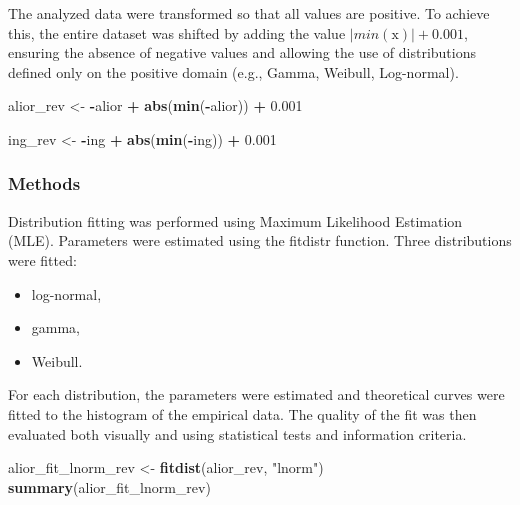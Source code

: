 \documentclass[
]{article}
\newenvironment{Shaded}{\begin{snugshade}}{\end{snugshade}}
\newcommand{\FloatTok}[1]{\textcolor[rgb]{0.00,0.00,0.81}{#1}}
\newcommand{\FunctionTok}[1]{\textcolor[rgb]{0.13,0.29,0.53}{\textbf{#1}}}
\newcommand{\NormalTok}[1]{#1}
\newcommand{\OtherTok}[1]{\textcolor[rgb]{0.56,0.35,0.01}{#1}}
\newcommand{\SpecialCharTok}[1]{\textcolor[rgb]{0.81,0.36,0.00}{\textbf{#1}}}
\newcommand{\StringTok}[1]{\textcolor[rgb]{0.31,0.60,0.02}{#1}}
\providecommand{\tightlist}{%
  \setlength{\itemsep}{0pt}\setlength{\parskip}{0pt}}
\begin{document}
The analyzed data were transformed so that all values are positive. To
achieve this, the entire dataset was shifted by adding the value
\(|min(\text{x})| + 0.001\), ensuring the absence of negative values and
allowing the use of distributions defined only on the positive domain
(e.g., Gamma, Weibull, Log-normal).

\begin{Shaded}
\begin{Highlighting}[]
\NormalTok{alior\_rev }\OtherTok{\textless{}{-}} \SpecialCharTok{{-}}\NormalTok{alior }\SpecialCharTok{+} \FunctionTok{abs}\NormalTok{(}\FunctionTok{min}\NormalTok{(}\SpecialCharTok{{-}}\NormalTok{alior)) }\SpecialCharTok{+} \FloatTok{0.001}
\end{Highlighting}
\end{Shaded}

\begin{Shaded}
\begin{Highlighting}[]
\NormalTok{ing\_rev }\OtherTok{\textless{}{-}} \SpecialCharTok{{-}}\NormalTok{ing }\SpecialCharTok{+} \FunctionTok{abs}\NormalTok{(}\FunctionTok{min}\NormalTok{(}\SpecialCharTok{{-}}\NormalTok{ing)) }\SpecialCharTok{+} \FloatTok{0.001}
\end{Highlighting}
\end{Shaded}

\subsubsection{Methods}\label{methods}

Distribution fitting was performed using Maximum Likelihood Estimation
(MLE). Parameters were estimated using the fitdistr function. Three
distributions were fitted:

\begin{itemize}
\tightlist
\item
  log-normal,
\item
  gamma,
\item
  Weibull.
\end{itemize}

For each distribution, the parameters were estimated and theoretical
curves were fitted to the histogram of the empirical data. The quality
of the fit was then evaluated both visually and using statistical tests
and information criteria.

\begin{Shaded}
\begin{Highlighting}[]
\NormalTok{alior\_fit\_lnorm\_rev }\OtherTok{\textless{}{-}} \FunctionTok{fitdist}\NormalTok{(alior\_rev, }\StringTok{"lnorm"}\NormalTok{)}
\FunctionTok{summary}\NormalTok{(alior\_fit\_lnorm\_rev)}
\end{Highlighting}
\end{Shaded}
\end{document}
